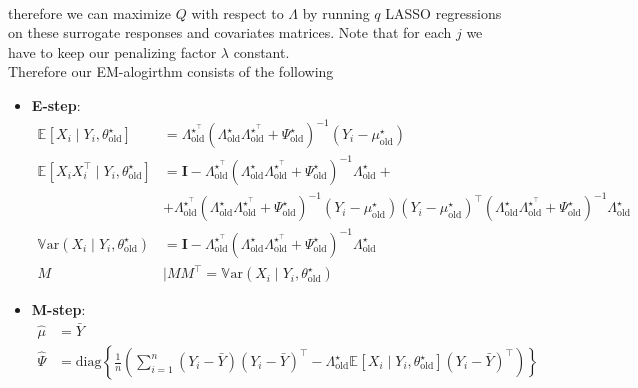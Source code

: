 \documentclass[10pt,notitlepage]{article}
\newcommand{\mean}[2][]{\mathbb{E}_{#1}\left[#2\right]}
\newcommand{\var}[2][]{\mathbb{V}_{#1}\text{ar}\left(#2\right)}
\newcommand{\Id}{\mathbf{I}}
\begin{document}
\begin{exercise}[Solution]
\begin{align*}
        \end{align*}
        therefore we can maximize $Q$ with respect to $\Lambda$ by running $q$ LASSO regressions on these surrogate responses and covariates matrices. Note that for each $j$ we have to keep our penalizing factor $\lambda$ constant.\\
        Therefore our EM-alogirthm consists of the following
        \begin{itemize}
            \item \textbf{E-step}:
                    \begin{align*}
                        \mean{X_i\mid Y_i, \theta^\star_{\text{old}}} &= \Lambda^{\star^\top}_{\text{old}}\left(\Lambda^\star_{\text{old}}\Lambda^{\star^\top}_{\text{old}}+\Psi^\star_{\text{old}}\right)^{-1}\left(Y_i-\mu^\star_{\text{old}}\right)\\
                        \mean{X_i X_i^\top\mid Y_i, \theta^\star_{\text{old}}} &= \Id-\Lambda^{\star^\top}_{\text{old}}\left(\Lambda^\star_{\text{old}}\Lambda^{\star^\top}_{\text{old}}+\Psi^\star_{\text{old}}\right)^{-1}\Lambda^\star_{\text{old}} + \\
                        &+\Lambda^{\star^\top}_{\text{old}}\left(\Lambda^\star_{\text{old}}\Lambda^{\star^\top}_{\text{old}}+\Psi^\star_{\text{old}}\right)^{-1}\left(Y_i-\mu^\star_{\text{old}}\right) \left(Y_i-\mu^\star_{\text{old}}\right)^\top \left(\Lambda^\star_{\text{old}}\Lambda^{\star^\top}_{\text{old}}+\Psi^\star_{\text{old}}\right)^{-1}\Lambda^{\star}_{\text{old}}\\
                        \var{X_i\mid Y_i, \theta^\star_{\text{old}}} &= \Id-\Lambda^{\star^\top}_{\text{old}}\left(\Lambda^\star_{\text{old}}\Lambda^{\star^\top}_{\text{old}}+\Psi^\star_{\text{old}}\right)^{-1}\Lambda^\star_{\text{old}}\\
                        M &\mid M M^\top = \var{X_i\mid Y_i, \theta^\star_{\text{old}}}
                    \end{align*}
            \item \textbf{M-step}:
                    \begin{align*}
                        \hat{\mu} &= \bar{Y}\\
                        \hat{\Psi} &= \text{diag}\left\{\frac{1}{n}\left(\sum_{i=1}^{n}\left(Y_i-\bar{Y}\right)\left(Y_i-\bar{Y}\right)^\top - \Lambda^\star_{\text{old}}\mean{X_i\mid Y_i, \theta^\star_{\text{old}}}\left(Y_i-\bar{Y}\right)^\top\right)\right\}
                    \end{align*}

\end{itemize}
\end{exercise}
\end{document}
